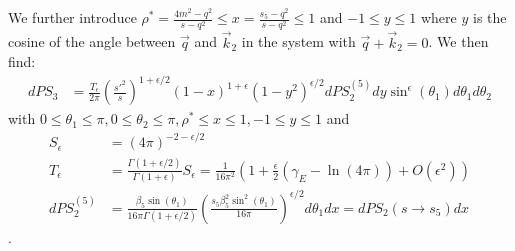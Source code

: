 We further introduce $\rho^* = \frac{4m^2-q^2}{s-q^2} \leq x = \frac{s_5-q^2}{s-q^2} \leq 1$ and $-1\leq y\leq 1$ where $y$ is the cosine of the angle between $\vec q$ and $\vec k_2$ in the system with $\vec q+\vec k_2 = 0$. We then find\cite{Harris:1995tu}:
\begin{align}
dPS_3 &= \frac {T_\epsilon}{2\pi} \left(\frac{{s'}^2}{s}\right)^{1+\epsilon/2}(1-x)^{1+\epsilon}(1-y^2)^{\epsilon/2}dPS_2^{(5)}dy \sin^{\epsilon}(\theta_1)d\theta_1d\theta_2
\end{align}
with $0\leq\theta_1\leq\pi, 0\leq \theta_2\leq \pi, \rho^*\leq x\leq 1,-1\leq y\leq 1$ and
\begin{align}
S_\epsilon &= (4\pi)^{-2-\epsilon/2}\\
T_\epsilon &= \frac{\Gamma(1+\epsilon/2)}{\Gamma(1+\epsilon)}S_\epsilon = \frac 1 {16\pi^2}\left(1 + \frac {\epsilon} 2(\gamma_E - \ln(4\pi)) + O(\epsilon^2)\right)\\
dPS_2^{(5)} &= \frac{\beta_5 \sin(\theta_1)}{16\pi\Gamma(1+\epsilon/2)}\left(\frac{s_5\beta_5^2\sin^2(\theta_1)}{16\pi}\right)^{\epsilon/2}d\theta_1dx = dPS_2(s\rightarrow s_5) dx
\end{align}.

